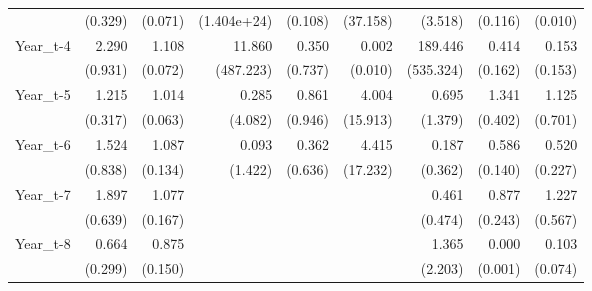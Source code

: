 \begin{table}[htbp]
\begin{tabular}{l*{8}{D{.}{.}{-1}}}
                    &     (0.329)         &     (0.071)         & (1.404e+24)         &     (0.108)         &    (37.158)         &     (3.518)         &     (0.116)         &     (0.010)         \\
Year\_t-4            &       2.290\sym{**} &       1.108\sym{\%}  &      11.860         &       0.350         &       0.002\sym{\%}  &     189.446\sym{*}  &       0.414\sym{**} &       0.153\sym{*}  \\
                    &     (0.931)         &     (0.072)         &   (487.223)         &     (0.737)         &     (0.010)         &   (535.324)         &     (0.162)         &     (0.153)         \\
Year\_t-5            &       1.215         &       1.014         &       0.285         &       0.861         &       4.004         &       0.695         &       1.341         &       1.125         \\
                    &     (0.317)         &     (0.063)         &     (4.082)         &     (0.946)         &    (15.913)         &     (1.379)         &     (0.402)         &     (0.701)         \\
Year\_t-6            &       1.524         &       1.087         &       0.093         &       0.362         &       4.415         &       0.187         &       0.586\sym{**} &       0.520\sym{\%}  \\
                    &     (0.838)         &     (0.134)         &     (1.422)         &     (0.636)         &    (17.232)         &     (0.362)         &     (0.140)         &     (0.227)         \\
Year\_t-7            &       1.897\sym{*}  &       1.077         &                     &                     &                     &       0.461         &       0.877         &       1.227         \\
                    &     (0.639)         &     (0.167)         &                     &                     &                     &     (0.474)         &     (0.243)         &     (0.567)         \\
Year\_t-8            &       0.664         &       0.875         &                     &                     &                     &       1.365         &       0.000\sym{**} &       0.103\sym{***}\\
                    &     (0.299)         &     (0.150)         &                     &                     &                     &     (2.203)         &     (0.001)         &     (0.074)         \\

\end{tabular}
\end{table}
